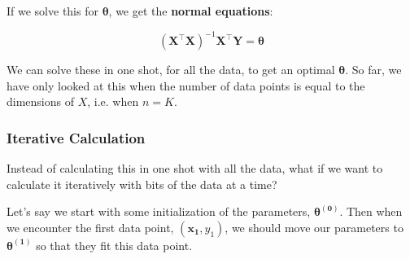 \documentclass{article}
\begin{document}
If we solve this for $\boldsymbol{\theta}$, we get the \hypertarget{normal}{\textbf{normal equations}}:

$$
\left(\boldsymbol{X}^{\top}\boldsymbol{X}\right)^{-1}\boldsymbol{X}^{\top}\boldsymbol{Y} = \boldsymbol{\theta}
$$

We can solve these in one shot, for all the data, to get an optimal $\boldsymbol{\theta}$. So far, we have only looked at this when the number of data points is equal to the dimensions of $X$, i.e. when $n=K$.

\subsubsection{Iterative Calculation}
Instead of calculating this in one shot with all the data, what if we want to calculate it iteratively with bits of the data at a time?

Let's say we start with some initialization of the parameters, $\boldsymbol{\theta^{\left(0\right)}}$. Then when we encounter the first data point, $\left(\boldsymbol{x_1}, y_1\right)$, we should move our parameters to $\boldsymbol{\theta^{\left(1\right)}}$ so that they fit this data point.

\begin{figure}[h!]
\centering
{}
\end{figure}
\end{document}

